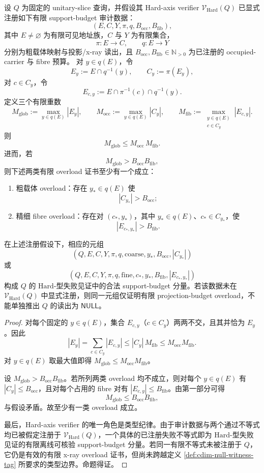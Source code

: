 \begin{proposition}\label{distill:wang_zahl-projection_multiplicity_product-cdim-authorized-xray-product-hard-witness}
设 \(Q\) 为固定的 unitary-slice 查询，并假设其 Hard-axis verifier
\(
\mathcal V_{\mathrm{Hard}}(Q)
\)
已显式注册如下有限 support-budget 审计数据：
\[
(E,C,Y,\pi,q,B_{\mathrm{occ}},B_{\mathrm{fib}}),
\]
其中 \(E\neq\varnothing\) 为有限可见地址族，\(C\) 与 \(Y\) 为有限集合，
\[
\pi:E\to C,\qquad q:E\to Y
\]
分别为粗载体映射与投影/x-ray 读出，且
\(B_{\mathrm{occ}},B_{\mathrm{fib}}\in\mathbb N_{>0}\) 为已注册的 occupied-carrier 与 fibre 预算。
对 \(y\in q(E)\)，令
\[
E_y:=E\cap q^{-1}(y),\qquad
C_y:=\pi(E_y),
\]
对 \(c\in C_y\)，令
\[
E_{c,y}:=E\cap\pi^{-1}(c)\cap q^{-1}(y).
\]
定义三个有限重数
\[
M_{\mathrm{glob}}:=\max_{y\in q(E)} |E_y|,
\qquad
M_{\mathrm{occ}}:=\max_{y\in q(E)} |C_y|,
\qquad
M_{\mathrm{fib}}:=\max_{\substack{y\in q(E)\\ c\in C_y}} |E_{c,y}|.
\]
则
\[
M_{\mathrm{glob}}\le M_{\mathrm{occ}}\,M_{\mathrm{fib}}.
\]
进而，若
\[
M_{\mathrm{glob}}>B_{\mathrm{occ}}B_{\mathrm{fib}},
\]
则下述两类有限 overload 证书至少有一个成立：
\begin{enumerate}
  \item 粗载体 overload：存在 \(y_\ast\in q(E)\) 使
  \[
  |C_{y_\ast}|>B_{\mathrm{occ}};
  \]
  \item 精细 fibre overload：存在对 \((c_\ast,y_\ast)\)，其中 \(y_\ast\in q(E)\)、\(c_\ast\in C_{y_\ast}\)，使
  \[
  |E_{c_\ast,y_\ast}|>B_{\mathrm{fib}}.
  \]
\end{enumerate}
在上述注册假设下，相应的元组
\[
(Q,E,C,Y,\pi,q,\mathrm{coarse},y_\ast,B_{\mathrm{occ}},|C_{y_\ast}|)
\]
或
\[
(Q,E,C,Y,\pi,q,\mathrm{fine},c_\ast,y_\ast,B_{\mathrm{fib}},|E_{c_\ast,y_\ast}|)
\]
构成 \(Q\) 的 \(\mathrm{Hard}\)-型失败见证中的合法 support-budget 分量。若该数据未在 \(\mathcal V_{\mathrm{Hard}}(Q)\) 中显式注册，则同一元组仅证明有限 projection-budget overload，不能单独推出 \(Q\) 的读出为 \(\mathsf{NULL}\)。
\end{proposition}
\begin{proof}
对每个固定的 \(y\in q(E)\)，集合 \(E_{c,y}\)（\(c\in C_y\)）两两不交，且其并恰为 \(E_y\)。因此
\[
|E_y|=\sum_{c\in C_y}|E_{c,y}|\le |C_y|\,M_{\mathrm{fib}}\le M_{\mathrm{occ}}M_{\mathrm{fib}}.
\]
对 \(y\in q(E)\) 取最大值即得
\(
M_{\mathrm{glob}}\le M_{\mathrm{occ}}M_{\mathrm{fib}}
\)。

设 \(M_{\mathrm{glob}}>B_{\mathrm{occ}}B_{\mathrm{fib}}\)。若所列两类 overload 均不成立，则对每个 \(y\in q(E)\) 有 \(|C_y|\le B_{\mathrm{occ}}\)，且对每个占用的 fibre 对有 \(|E_{c,y}|\le B_{\mathrm{fib}}\)。由第一部分可得
\[
M_{\mathrm{glob}}\le B_{\mathrm{occ}}B_{\mathrm{fib}},
\]
与假设矛盾。故至少有一类 overload 成立。

最后，Hard-axis verifier 的唯一角色是类型纪律。由于审计数据与两个通过不等式均已被假定注册于 \(\mathcal V_{\mathrm{Hard}}(Q)\)，一个具体的已注册失败不等式即为 \(\mathrm{Hard}\)-型失败见证的有限离线可核验 support-budget 分量。若同一有限不等式未被注册于 \(Q\)，它仍是有效的有限 x-ray overload 证书，但尚未跨越定义 \ref{def:cdim-null-witness-tag} 所要求的类型边界。命题得证。\qedhere
\end{proof}

